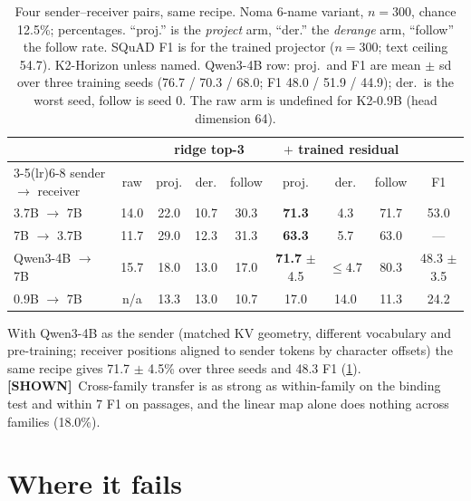 \documentclass[11pt,a4paper]{report}
\newcommand{\SHOWN}{\textcolor{shownc}{\textbf{\scriptsize[SHOWN]}}}
\begin{document}
\begin{table}[h]
\caption{Four sender--receiver pairs, same recipe. Noma 6-name variant, $n = 300$, chance 12.5\%; percentages. ``proj.'' is the \emph{project} arm, ``der.'' the \emph{derange} arm, ``follow'' the follow rate. SQuAD F1 is for the trained projector ($n = 300$; text ceiling 54.7). K2-Horizon unless named. Qwen3-4B row: proj.\ and F1 are mean $\pm$ sd over three training seeds (76.7 / 70.3 / 68.0; F1 48.0 / 51.9 / 44.9); der.\ is the worst seed, follow is seed 0. The raw arm is undefined for K2-0.9B (head dimension 64).}
\label{tab:pairs}
\vskip 0.1in
\begin{center}
\begin{footnotesize}
\begin{tabular}{lcccccccc}
\toprule
& & \multicolumn{3}{c}{ridge top-3} & \multicolumn{3}{c}{$+$ trained residual} & \\
\cmidrule(lr){3-5}\cmidrule(lr){6-8}
sender $\rightarrow$ receiver & raw & proj. & der. & follow & proj. & der. & follow & F1 \\
\midrule
3.7B $\rightarrow$ 7B    & 14.0 & 22.0 & 10.7 & 30.3 & \textbf{71.3} & 4.3 & 71.7 & 53.0 \\
7B $\rightarrow$ 3.7B    & 11.7 & 29.0 & 12.3 & 31.3 & \textbf{63.3} & 5.7 & 63.0 & --- \\
Qwen3-4B $\rightarrow$ 7B & 15.7 & 18.0 & 13.0 & 17.0 & \textbf{71.7} $\pm$ 4.5 & $\le 4.7$ & 80.3 & 48.3 $\pm$ 3.5 \\
0.9B $\rightarrow$ 7B    & n/a  & 13.3 & 13.0 & 10.7 & 17.0 & 14.0 & 11.3 & 24.2 \\
\bottomrule
\end{tabular}
\end{footnotesize}
\end{center}
\end{table}

With Qwen3-4B as the sender (matched KV geometry, different vocabulary and pre-training; receiver positions aligned to sender tokens by character offsets) the same recipe gives 71.7 $\pm$ 4.5\% over three seeds and 48.3 F1 (\cref{tab:pairs}). \SHOWN\ Cross-family transfer is as strong as within-family on the binding test and within 7 F1 on passages, and the linear map alone does nothing across families (18.0\%).

\section{Where it fails}
\end{document}
